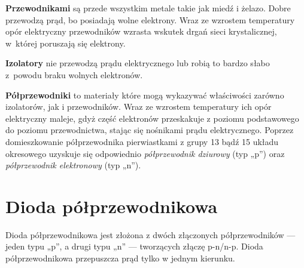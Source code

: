 \textbf{Przewodnikami} są przede wszystkim metale takie jak miedź i żelazo. Dobre przewodzą prąd,
bo posiadają wolne elektrony. Wraz ze wzrostem temperatury opór elektryczny przewodników wzrasta
wskutek drgań sieci krystalicznej, w~której poruszają się elektrony.

\textbf{Izolatory} nie przewodzą prądu elektrycznego lub robią to bardzo słabo z~powodu braku
wolnych elektronów.

\textbf{Półprzewodniki} to materiały które mogą wykazywać właściwości zarówno izolatorów, jak i
przewodników. Wraz ze wzrostem temperatury ich opór elektryczny maleje, gdyż część elektronów
przeskakuje z poziomu podstawowego do poziomu przewodnictwa, stając się nośnikami prądu
elektrycznego. Poprzez domieszkowanie półprzewodnika pierwiastkami z grupy 13 bądź 15 układu
okresowego uzyskuje się odpowiednio \emph{półprzewodnik dziurowy} (typ „p”) oraz \emph{półprzewodnik
elektronowy} (typ „n”).

\section{Dioda półprzewodnikowa}
Dioda półprzewodnikowa jest złożona z dwóch złączonych półprzewodników --- jeden typu „p”, a drugi
typu „n” --- tworzących złączę p-n/n-p. Dioda półprzewodnikowa przepuszcza prąd tylko w jednym kierunku.
